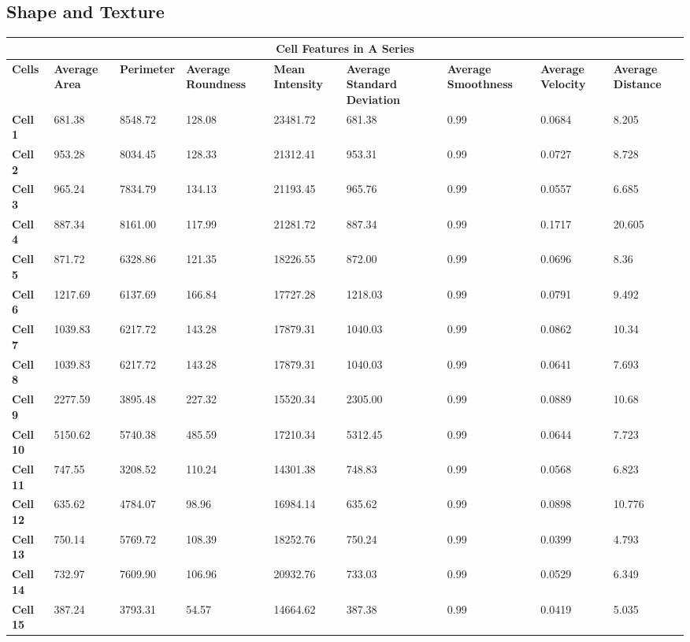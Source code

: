 \documentclass{article}
\begin{document}
\subsection*{Shape and Texture}


\begin{table}[h!]
\centering
\begin{tabular}{|p{1.2cm}|p{1.5cm}|p{1.5cm}|p{1.5cm}|p{1.7cm}|p{1.5cm}|p{1.7cm}|p{1.5cm}|p{1.7cm}|}
\hline
\multicolumn{9}{|c|}{\textbf{Cell Features in A Series}} \\
\hline
\textbf{Cells} & \textbf{Average Area} & \textbf{Perimeter} & \textbf{Average Roundness} & \textbf{Mean Intensity} & \textbf{Average Standard Deviation} & \textbf{Average Smoothness} & \textbf{Average Velocity} & \textbf{Average Distance} \\
\hline
\textbf{Cell 1} & 681.38 & 8548.72 & 128.08 & 23481.72 & 681.38 & 0.99 & 0.0684 & 8.205 \\
\textbf{Cell 2} & 953.28 & 8034.45 & 128.33 & 21312.41 & 953.31 & 0.99 & 0.0727 & 8.728 \\
\textbf{Cell 3} & 965.24 & 7834.79 & 134.13 & 21193.45 & 965.76 & 0.99 & 0.0557 & 6.685 \\
\textbf{Cell 4} & 887.34 & 8161.00 & 117.99 & 21281.72 & 887.34 & 0.99 & 0.1717 & 20.605 \\
\textbf{Cell 5} & 871.72 & 6328.86 & 121.35 & 18226.55 & 872.00 & 0.99 & 0.0696 & 8.36 \\
\textbf{Cell 6} & 1217.69 & 6137.69 & 166.84 & 17727.28 & 1218.03 & 0.99 & 0.0791 & 9.492 \\
\textbf{Cell 7} & 1039.83 & 6217.72 & 143.28 & 17879.31 & 1040.03 & 0.99 & 0.0862 & 10.34 \\
\textbf{Cell 8} & 1039.83 & 6217.72 & 143.28 & 17879.31 & 1040.03 & 0.99 & 0.0641 & 7.693 \\
\textbf{Cell 9} & 2277.59 & 3895.48 & 227.32 & 15520.34 & 2305.00 & 0.99 & 0.0889 & 10.68 \\
\textbf{Cell 10} & 5150.62 & 5740.38 & 485.59 & 17210.34 & 5312.45 & 0.99 & 0.0644 & 7.723 \\
\textbf{Cell 11} & 747.55 & 3208.52 & 110.24 & 14301.38 & 748.83 & 0.99 & 0.0568 & 6.823 \\
\textbf{Cell 12} & 635.62 & 4784.07 & 98.96 & 16984.14 & 635.62 & 0.99 & 0.0898 & 10.776 \\
\textbf{Cell 13} & 750.14 & 5769.72 & 108.39 & 18252.76 & 750.24 & 0.99 & 0.0399 & 4.793 \\
\textbf{Cell 14} & 732.97 & 7609.90 & 106.96 & 20932.76 & 733.03 & 0.99 & 0.0529 & 6.349 \\
\textbf{Cell 15} & 387.24 & 3793.31 & 54.57 & 14664.62 & 387.38 & 0.99 & 0.0419 & 5.035 \\
\hline
\end{tabular}
\end{table}
\end{document}
